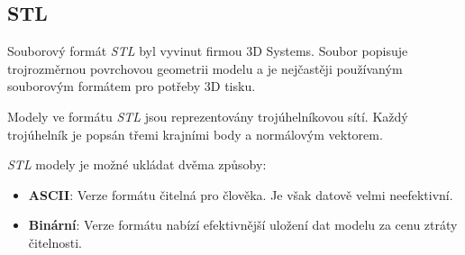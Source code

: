 \subsection{STL}
Souborový formát \textit{\gls{STL}} byl vyvinut firmou 3D Systems. Soubor popisuje trojrozměrnou povrchovou geometrii modelu a je nejčastěji používaným souborovým formátem pro potřeby 3D tisku. \autocite{3DAddFab}

Modely ve formátu \textit{\gls{STL}} jsou reprezentovány trojúhelníkovou sítí. Každý trojúhelník je popsán třemi krajními body a normálovým vektorem. \autocite{stl:specification}

\textit{\gls{STL}} modely je možné ukládat dvěma způsoby:  
\begin{itemize}
    \item \textbf{ASCII}: Verze formátu čitelná pro člověka. Je však datově velmi neefektivní.
    \item \textbf{Binární}: Verze formátu nabízí efektivnější uložení dat modelu za cenu ztráty čitelnosti.
\end{itemize}